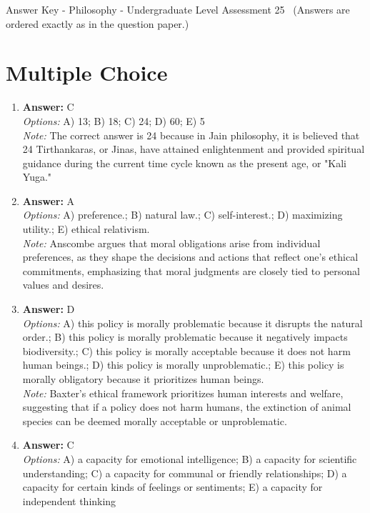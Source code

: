 \documentclass[12pt]{article}
\begin{document}
\begin{center}
Answer Key - Philosophy - Undergraduate Level Assessment 25 \
\small (Answers are ordered exactly as in the question paper.)
\end{center}

\section*{Multiple Choice}
\begin{enumerate}[label=\arabic*.]
\item \textbf{Answer:} C
\\ \textit{Options:} A) 13; B) 18; C) 24; D) 60; E) 5
\\ \textit{Note:} The correct answer is 24 because in Jain philosophy, it is believed that 24 Tirthankaras, or Jinas, have attained enlightenment and provided spiritual guidance during the current time cycle known as the present age, or "Kali Yuga."
\item \textbf{Answer:} A
\\ \textit{Options:} A) preference.; B) natural law.; C) self-interest.; D) maximizing utility.; E) ethical relativism.
\\ \textit{Note:} Anscombe argues that moral obligations arise from individual preferences, as they shape the decisions and actions that reflect one's ethical commitments, emphasizing that moral judgments are closely tied to personal values and desires.
\item \textbf{Answer:} D
\\ \textit{Options:} A) this policy is morally problematic because it disrupts the natural order.; B) this policy is morally problematic because it negatively impacts biodiversity.; C) this policy is morally acceptable because it does not harm human beings.; D) this policy is morally unproblematic.; E) this policy is morally obligatory because it prioritizes human beings.
\\ \textit{Note:} Baxter's ethical framework prioritizes human interests and welfare, suggesting that if a policy does not harm humans, the extinction of animal species can be deemed morally acceptable or unproblematic.
\item \textbf{Answer:} C
\\ \textit{Options:} A) a capacity for emotional intelligence; B) a capacity for scientific understanding; C) a capacity for communal or friendly relationships; D) a capacity for certain kinds of feelings or sentiments; E) a capacity for independent thinking

\end{enumerate}
\end{document}
